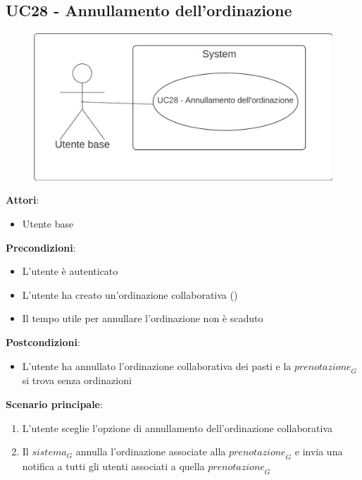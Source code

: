 \subsection{UC28 - Annullamento dell'ordinazione}\label{usecase:28}
\begin{figure}[H]
    \centering
    \includegraphics[width=0.9\linewidth]{ucd/UCD28.png}
\end{figure}
\textbf{Attori}:
\begin{itemize}
    \item Utente base
\end{itemize}
\textbf{Precondizioni}:
\begin{itemize}
    \item L'utente è autenticato
    \item L'utente ha creato un'ordinazione collaborativa ()
    \item Il tempo utile per annullare l'ordinazione non è scaduto
\end{itemize}
\textbf{Postcondizioni}:
\begin{itemize}
    \item L'utente ha annullato l'ordinazione collaborativa dei pasti e la $\textit{prenotazione}_G$ si trova senza ordinazioni
\end{itemize}
\textbf{Scenario principale}:
\begin{enumerate}
    \item L'utente sceglie l'opzione di annullamento dell'ordinazione collaborativa
    \item Il $\textit{sistema}_G$ annulla l'ordinazione associate alla $\textit{prenotazione}_G$ e invia una notifica a tutti gli utenti associati a quella $\textit{prenotazione}_G$
\end{enumerate}
\newpage